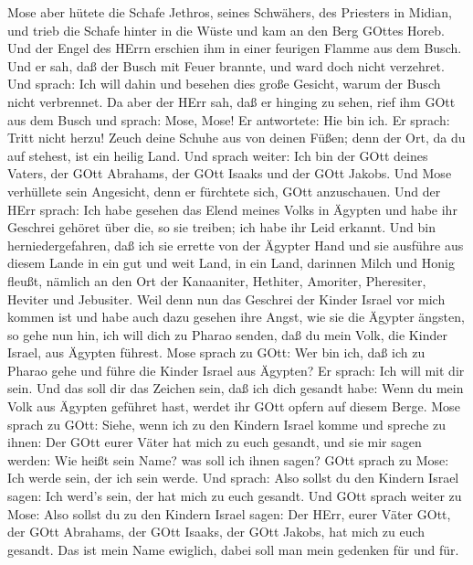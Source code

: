  Mose aber hütete die Schafe Jethros, seines Schwähers, des
Priesters in Midian, und trieb die Schafe hinter in die Wüste und kam an
den Berg GOttes Horeb.  Und der Engel des HErrn erschien ihm
in einer feurigen Flamme aus dem Busch. Und er sah, daß der Busch mit
Feuer brannte, und ward doch nicht verzehret.  Und sprach:
Ich will dahin und besehen dies große Gesicht, warum der Busch nicht
verbrennet.  Da aber der HErr sah, daß er hinging zu sehen,
rief ihm GOtt aus dem Busch und sprach: Mose, Mose! Er antwortete: Hie
bin ich.  Er sprach: Tritt nicht herzu! Zeuch deine Schuhe
aus von deinen Füßen; denn der Ort, da du auf stehest, ist ein heilig
Land.  Und sprach weiter: Ich bin der GOtt deines Vaters,
der GOtt Abrahams, der GOtt Isaaks und der GOtt Jakobs. Und Mose
verhüllete sein Angesicht, denn er fürchtete sich, GOtt anzuschauen.
 Und der HErr sprach: Ich habe gesehen das Elend meines
Volks in Ägypten und habe ihr Geschrei gehöret über die, so sie treiben;
ich habe ihr Leid erkannt.  Und bin herniedergefahren, daß
ich sie errette von der Ägypter Hand und sie ausführe aus diesem Lande
in ein gut und weit Land, in ein Land, darinnen Milch und Honig fleußt,
nämlich an den Ort der Kanaaniter, Hethiter, Amoriter, Pheresiter,
Heviter und Jebusiter.  Weil denn nun das Geschrei der
Kinder Israel vor mich kommen ist und habe auch dazu gesehen ihre Angst,
wie sie die Ägypter ängsten,  so gehe nun hin, ich will
dich zu Pharao senden, daß du mein Volk, die Kinder Israel, aus Ägypten
führest.  Mose sprach zu GOtt: Wer bin ich, daß ich zu
Pharao gehe und führe die Kinder Israel aus Ägypten?  Er
sprach: Ich will mit dir sein. Und das soll dir das Zeichen sein, daß
ich dich gesandt habe: Wenn du mein Volk aus Ägypten geführet hast,
werdet ihr GOtt opfern auf diesem Berge.  Mose sprach zu
GOtt: Siehe, wenn ich zu den Kindern Israel komme und spreche zu ihnen:
Der GOtt eurer Väter hat mich zu euch gesandt, und sie mir sagen werden:
Wie heißt sein Name? was soll ich ihnen sagen?  GOtt sprach
zu Mose: Ich werde sein, der ich sein werde. Und sprach: Also sollst du
den Kindern Israel sagen: Ich werd's sein, der hat mich zu euch gesandt.
 Und GOtt sprach weiter zu Mose: Also sollst du zu den
Kindern Israel sagen: Der HErr, eurer Väter GOtt, der GOtt Abrahams, der
GOtt Isaaks, der GOtt Jakobs, hat mich zu euch gesandt. Das ist mein
Name ewiglich, dabei soll man mein gedenken für und für. 
